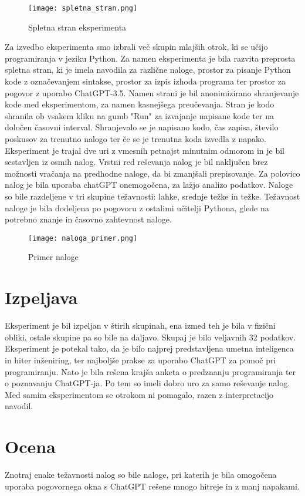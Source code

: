 \documentclass[12pt,a4paper]{book}
\begin{document}
\begin{figure}[H]
    \centering
    \texttt{[image: spletna\_stran.png]}
    \caption{Spletna stran eksperimenta}
    \label{fig:enter-label}
\end{figure}


Za izvedbo eksperimenta smo izbrali več skupin mlajših otrok, ki se učijo programiranja v jeziku Python. Za namen eksperimenta je bila razvita preprosta spletna stran, ki je imela navodila za različne naloge, prostor za pisanje Python kode z označevanjem sintakse, prostor za izpis izhoda programa ter prostor za pogovor z uporabo ChatGPT-3.5. Namen strani je bil anonimizirano shranjevanje kode med eksperimentom, za namen kasnejšega preučevanja. Stran je kodo shranila ob vsakem kliku na gumb "Run" za izvajanje napisane kode ter na določen časovni interval. Shranjevalo se je napisano kodo, čas zapisa, število poskusov za trenutno nalogo ter če se je trenutna koda izvedla z napako. Eksperiment je trajal dve uri z vmesnih petnajst minutnim odmorom in je bil sestavljen iz osmih nalog. Vrstni red reševanja nalog je bil naključen brez možnosti vračanja na predhodne naloge, da bi zmanjšali prepisovanje. Za polovico nalog je bila uporaba chatGPT onemogočena, za lažjo analizo podatkov. Naloge so bile razdeljene v tri skupine težavnosti: lahke, srednje težke in težke. Težavnost naloge je bila dodeljena po pogovoru z ostalimi učitelji Pythona, glede na potrebno znanje in časovno zahtevnost naloge.

\begin{figure}[H]
    \centering
    \texttt{[image: naloga\_primer.png]}
    \caption{Primer naloge}
    \label{fig:enter-label}
\end{figure}
\section{Izpeljava}
Eksperiment je bil izpeljan v štirih skupinah, ena izmed teh je bila v fizični obliki, ostale skupine pa so bile na daljavo. Skupaj je bilo veljavnih 32 podatkov. Eksperiment je potekal tako, da je bilo najprej predstavljena umetna inteligenca in hiter inženiring, ter najboljše prakse za uporabo ChatGPT za pomoč pri programiranju. Nato je bila rešena krajša anketa o predznanju programiranja ter o poznavanju ChatGPT-ja. Po tem so imeli dobro uro za samo reševanje nalog. Med samim eksperimentom se otrokom ni pomagalo, razen z interpretacijo navodil.
\section{Ocena}
Znotraj enake težavnosti nalog so bile naloge, pri katerih je bila omogočena uporaba pogovornega okna s ChatGPT rešene mnogo hitreje in z manj napakami. 

\printbibliography
\end{document}
